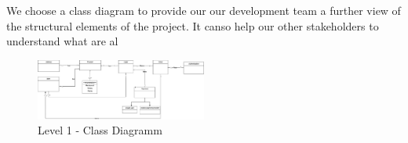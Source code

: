 We choose a \gls{class diagram} to provide our our development team a further view of the structural elements 
of the project. It canso help our other stakeholders to understand what are 
 al
\begin{figure}[H]
    \centering
    \includegraphics[width=0.5\textwidth]{assets/simple_classes_CD.jpg}
    \caption{Level 1 - Class Diagramm}
    \label{fig:simple_class_diagram}
\end{figure}




 




